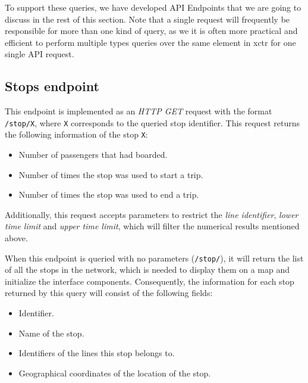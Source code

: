     To support these queries, we have developed API Endpoints that we are going to discuss in the rest of this section. Note that a single request will frequently be responsible for more than one kind of query, as we it is often more practical and efficient to perform multiple types queries over the same element in \gls{xctr} for one single API request.
    
    \subsection{Stops endpoint}
    This endpoint is implemented as an {\em HTTP GET} request with the format \texttt{/stop/X}, where \texttt{X} corresponds to the queried stop identifier. This request returns the following information of the stop \texttt{X}:
    
    \begin{itemize}
        \item Number of passengers that had boarded.
        \item Number of times the stop was used to start a trip.
        \item Number of times the stop was used to end a trip.
    \end{itemize}
    
    Additionally, this request accepts parameters to restrict the \textit{line identifier}, \textit{lower time limit} and \textit{upper time limit}, which will filter the numerical results mentioned above.
    
    When this endpoint is queried with no parameters (\texttt{/stop/}), it will return the list of all the stops in the network, which is needed to display them on a map and initialize the interface components. Consequently, the information for each stop returned by this query will consist of the following fields:
    
    \begin{itemize}
        \item Identifier.
        \item Name of the stop.
        \item Identifiers of the lines this stop belongs to.
        \item Geographical coordinates of the location of the stop.
    \end{itemize}
    
